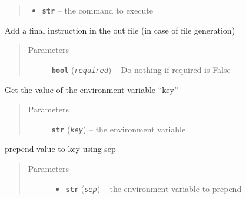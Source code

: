 \documentclass[a4paper,10pt,english]{sphinxmanual}
\begin{document}
\begin{fulllineitems}
\begin{fulllineitems}
\begin{quote}
\begin{description}
\begin{itemize}
\item {} 
\textbf{\texttt{str}} -- the command to execute

\end{itemize}

\end{description}\end{quote}

\end{fulllineitems}


\begin{fulllineitems}
\label{commands/apidoc/src:src.fileEnviron.ContextFileEnviron.finish}
Add a final instruction in the out file (in case of file generation)
\begin{quote}\begin{description}
\item[{Parameters}] \leavevmode
\textbf{\texttt{bool}} (\emph{\texttt{required}}) -- Do nothing if required is False

\end{description}\end{quote}

\end{fulllineitems}


\begin{fulllineitems}
\label{commands/apidoc/src:src.fileEnviron.ContextFileEnviron.get}
Get the value of the environment variable ``key''
\begin{quote}\begin{description}
\item[{Parameters}] \leavevmode
\textbf{\texttt{str}} (\emph{\texttt{key}}) -- the environment variable

\end{description}\end{quote}

\end{fulllineitems}


\begin{fulllineitems}
\label{commands/apidoc/src:src.fileEnviron.ContextFileEnviron.prepend_value}
prepend value to key using sep
\begin{quote}\begin{description}
\item[{Parameters}] \leavevmode\begin{itemize}
\item {} 
\textbf{\texttt{str}} (\emph{\texttt{sep}}) -- the environment variable to prepend


\end{itemize}
\end{description}
\end{quote}
\end{fulllineitems}
\end{fulllineitems}
\end{document}
